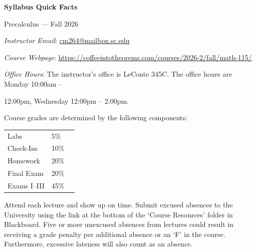 \documentclass[11pt,letterpaper]{article}
\begin{document}
\begin{center} 
\bfseries
\color{scred}
\LARGE Syllabus Quick Facts \par\vspace{0.1\baselineskip}
\Large Precalculus --- Fall 2026
\end{center} \par\vspace{0.3cm}


\hspace{0.53cm} {\itshape Instructor Email}: \href{mailto:cm264@mailbox.sc.edu}{cm264@mailbox.sc.edu} \par
\hspace{0.53cm} {\itshape Course Webpage}: \href{https://coffeeintotheorems.com/courses/2026-2/fall/math-115/}{https://coffeeintotheorems.com/courses/2026-2/fall/math-115/} \par
\hspace{0.53cm} {\itshape Office Hours}: The instructor's office is LeConte 345C. The office hours are Monday 10:00am -- \par\hspace{0.5cm} 12:00pm, Wednesday 12:00pm -- 2:00pm. \par\vspace{0.3cm}


Course grades are determined by the following components: \par \vspace{-0.3cm}
	\begin{table}[!ht]
        \begin{tabular}{llr}
        Labs & 5\% \\
	Check-Ins & 10\% \\
	Homework & 20\% \\
	Final Exam & 20\% \\
	Exams I--III & 45\% \\
        \end{tabular} 
        \end{table}


Attend each lecture and show up on time. Submit excused absences to the University using the link at the bottom of the `Course Resources' folder in Blackboard. Five or more unexcused absences from lectures could result in receiving a grade penalty per additional absence or an `F' in the course. Furthermore, excessive lateness will also count as an absence. \par\vspace{0.3cm}
\end{document}
